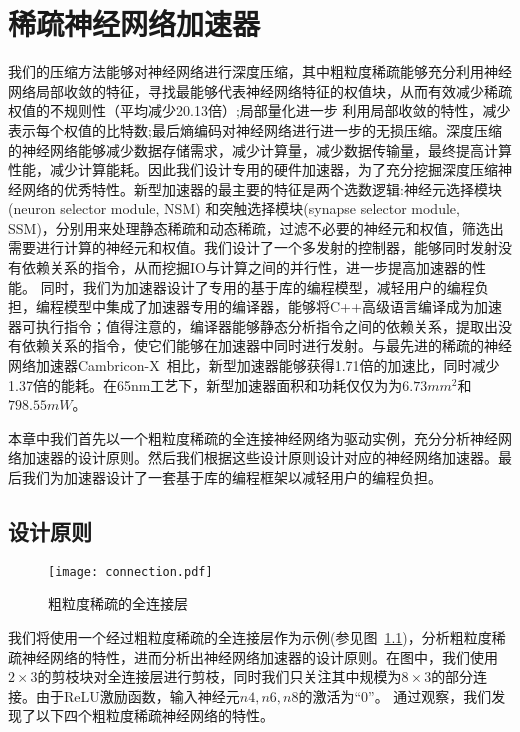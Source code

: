 \chapter{稀疏神经网络加速器}

我们的压缩方法能够对神经网络进行深度压缩，其中粗粒度稀疏能够充分利用神经网络局部收敛的特征，寻找最能够代表神经网络特征的权值块，从而有效减少稀疏权值的不规则性（平均减少20.13倍）;局部量化进一步
利用局部收敛的特性，减少表示每个权值的比特数;最后熵编码对神经网络进行进一步的无损压缩。深度压缩的神经网络能够减少数据存储需求，减少计算量，减少数据传输量，最终提高计算性能，减少计算能耗。因此我们设计专用的硬件加速器，为了充分挖掘深度压缩神经网络的优秀特性。新型加速器的最主要的特征是两个选数逻辑:神经元选择模块 (neuron selector module, NSM) 和突触选择模块(synapse selector module, SSM)，分别用来处理静态稀疏和动态稀疏，过滤不必要的神经元和权值，筛选出需要进行计算的神经元和权值。我们设计了一个多发射的控制器，能够同时发射没有依赖关系的指令，从而挖掘IO与计算之间的并行性，进一步提高加速器的性能。
同时，我们为加速器设计了专用的基于库的编程模型，减轻用户的编程负担，编程模型中集成了加速器专用的编译器，能够将C++高级语言编译成为加速器可执行指令；值得注意的，编译器能够静态分析指令之间的依赖关系，提取出没有依赖关系的指令，使它们能够在加速器中同时进行发射。与最先进的稀疏的神经网络加速器Cambricon-X~\cite{zhang2016cambricon}相比，新型加速器能够获得1.71倍的加速比，同时减少1.37倍的能耗。在65nm工艺下，新型加速器面积和功耗仅仅为为$6.73mm^2$和$798.55mW$。

本章中我们首先以一个粗粒度稀疏的全连接神经网络为驱动实例，充分分析神经网络加速器的设计原则。然后我们根据这些设计原则设计对应的神经网络加速器。最后我们为加速器设计了一套基于库的编程框架以减轻用户的编程负担。

\section{设计原则}
\label{sec:principle}

\begin{figure}[ht]
\centering
\texttt{[image: connection.pdf]}
\caption{粗粒度稀疏的全连接层}
\label{fig:connection}
\end{figure}

我们将使用一个经过粗粒度稀疏的全连接层作为示例(参见图~\ref{fig:connection})，分析粗粒度稀疏神经网络的特性，进而分析出神经网络加速器的设计原则。在图中，我们使用$2\times 3$的剪枝块对全连接层进行剪枝，同时我们只关注其中规模为$8\times 3$的部分连接。由于ReLU激励函数，输入神经元$n4, n6, n8$的激活为“0”。
通过观察，我们发现了以下四个粗粒度稀疏神经网络的特性。

